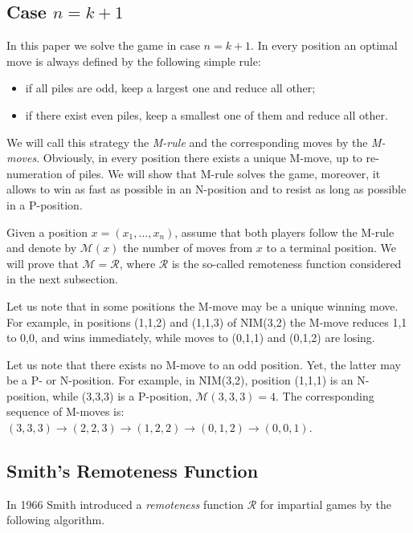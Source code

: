 \documentclass{article}
\theoremstyle{definition}
\def\R{\mathcal{R}}
\def\M{\mathcal{M}}
\begin{document}
\subsection{Case $n = k+1$}
\label{ss01}
In this paper we solve the game in case $n = k+1$. 
In every position an optimal move 
is always defined by the following simple rule: 
\begin{itemize}
\item[] if all piles are odd, 
keep a largest one and reduce all other;
\item[] if there exist even piles, 
keep a smallest one of them 
and reduce all other. 
\end{itemize}


We will call this strategy the {\em M-rule} and 
the corresponding moves by the {\em M-moves}. 
Obviously, in every position 
there exists a unique M-move, 
up to re-numeration of piles. 
We will show that M-rule solves the game, moreover, 
it allows to win as fast as possible in an N-position and 
to resist as long as possible in a P-position. 

\smallskip 

Given a position  $x = (x_1, \ldots, x_n)$, 
assume that both players follow the M-rule and  
denote by $\M(x)$  the number of moves 
from  $x$  to a terminal position. 
We will prove that  $\M = \R$, where 
$\R$  is the so-called remoteness function 
considered in the next subsection.

\smallskip  

Let us note that in some positions 
the M-move may be a unique winning move. 
For example, in positions 
(1,1,2)  and  (1,1,3)  of NIM(3,2)  
the M-move  reduces  1,1  to 0,0, 
and wins immediately, while moves 
to  (0,1,1)  and  (0,1,2)  are losing. 

\smallskip 

Let us note 
that there exists no M-move to an odd position. 
Yet, the latter may be a P- or N-position. 
For example, in NIM(3,2), position 
(1,1,1)  is an N-position, 
while  (3,3,3)  is a P-position, $\M(3,3,3) = 4$. 
The corresponding sequence of M-moves is: 
$(3,3,3) \to (2,2,3) \to (1,2,2) \to (0,1,2) \to (0,0,1).$ 

\subsection{Smith's Remoteness Function} 
\label{ss02}
In 1966 Smith \cite{Smi66} 
introduced a {\em remoteness} function $\R$ 
for impartial games by the following algorithm. 
\end{document}
